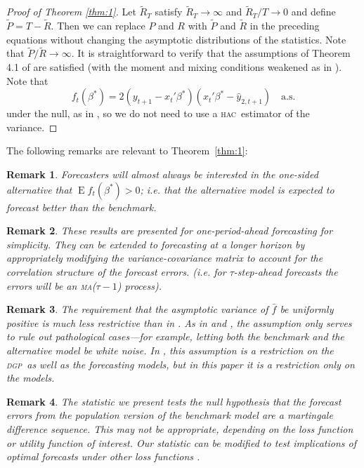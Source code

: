\documentclass[12pt]{article}
\newtheorem{rem}{Remark}
\DeclareMathOperator{\E}{E}
\newcommand{\dgp}{\textsc{dgp}}
\newcommand{\hac}{\textsc{hac}}
\newcommand{\ma}{\textsc{ma}}
\begin{document}
\begin{proof}[Proof of Theorem \ref{thm:1}] Let $\tilde{R}_T$ satisfy
  $\tilde{R}_T \to \infty$ and $\tilde{R}_T/T \to 0$ and define
  $\tilde{P} = T - \tilde{R}$.  Then we can replace $P$ and $R$ with
  $\tilde{P}$ and $\tilde{R}$ in the preceding equations without
  changing the asymptotic distributions of the statistics. Note that
  $\tilde{P}/\tilde{R} \to \infty$. It is straightforward to verify
  that the assumptions of Theorem 4.1 of \citet{Wes:96} are satisfied
  (with the moment and mixing conditions weakened as in
  \citet{Mcc:00}).  Note that \[f_t(\beta^{*})= 2 (y_{t+1} -
  x_t'\beta^{*})(x_t'\beta^{*} - \hat{y}_{2,t+1}) \quad \text{a.s.}\]
  under the null, as in \citet{ClW:07}, so we do not need to use a
  \hac\ estimator of the variance.
\end{proof}
The following remarks are relevant to Theorem~\ref{thm:1}:

\begin{rem}
  Forecasters will almost always be interested in the one-sided
  alternative that $\E f_t(\beta^{*}) > 0$; i.e. that the alternative
  model is expected to forecast better than the benchmark.
\end{rem}

\begin{rem}
  These results are presented for one-period-ahead forecasting for
  simplicity.  They can be extended to forecasting at a longer horizon
  by appropriately modifying the variance-covariance matrix to account
  for the correlation structure of the forecast errors. (i.e. for
  $\tau$-step-ahead forecasts the errors will be an \ma($\tau-1$) process).
\end{rem}

\begin{rem}
  The requirement that the asymptotic variance of $\bar f$ be
  uniformly positive is much less restrictive than in \cite{Wes:96}.
  As in \cite{GiW:06} and \citet{ClW:06,ClW:07}, the assumption only
  serves to rule out pathological cases---for example, letting both
  the benchmark and the alternative model be white noise. In
  \citet{Wes:96}, this assumption is a restriction on the \dgp\ as
  well as the forecasting models, but in this paper it is a
  restriction only on the models.
\end{rem}

\begin{rem}
  The statistic we present tests the null hypothesis that the forecast
  errors from the population version of the benchmark model are a
  martingale difference sequence.  This may not be appropriate,
  depending on the loss function or utility function of interest.  Our
  statistic can be modified to test implications of optimal forecasts
  under other loss functions \citep[see][]{PaT:07,PaT:07b}.
\end{rem}
\end{document}
